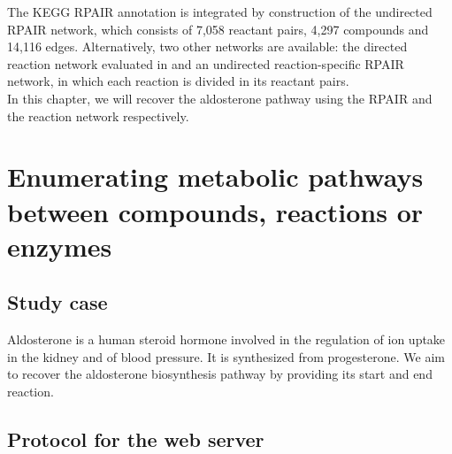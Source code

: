 The KEGG RPAIR annotation is integrated by construction of the undirected RPAIR network, which consists of 7,058 reactant pairs,
4,297 compounds and 14,116 edges. Alternatively, two other networks are available: the directed reaction network evaluated in
\cite{croes06} and an undirected reaction-specific RPAIR network, in which each reaction is divided in its reactant pairs.\\

In this chapter, we will recover the aldosterone pathway using the RPAIR and the reaction network respectively.

\section{Enumerating metabolic pathways between compounds, reactions or enzymes}

\subsection{Study case}

Aldosterone is a human steroid hormone involved in the regulation of ion uptake in the kidney and of blood pressure.
It is synthesized from progesterone. We aim to recover the aldosterone biosynthesis pathway by providing
its start and end reaction.

\subsection{Protocol for the web server}

